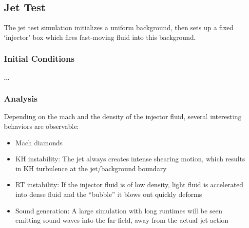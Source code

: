 
\subsection{Jet Test}

The jet test simulation initializes a uniform background, then sets up a fixed `injector' box
which fires fast-moving fluid into this background.

\subsubsection{Initial Conditions}

...

\subsubsection{Analysis}

Depending on the mach and the density of the injector fluid, several interesting behaviors are observable:
\begin{itemize}
\item Mach diamonds
\item KH instability: The jet always creates intense shearing motion, which results in KH turbulence at the jet/background boundary
\item RT instability: If the injector fluid is of low density, light fluid is accelerated into dense fluid and the ``bubble'' it blows out quickly deforms
\item Sound generation: A large simulation with long runtimes will be seen emitting sound waves into the far-field, away from the actual jet action
\end{itemize}


